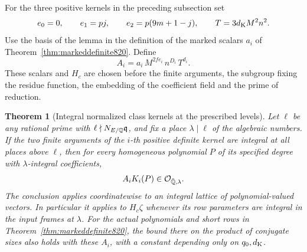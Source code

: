 \documentclass[a4paper,11pt]{article}
\newtheorem{theorem}[proposition]{Theorem}
\theoremstyle{definition}
\theoremstyle{remark}
\numberwithin{equation}{section}
\newcommand{\OO}{\mathcal O}
\begin{document}
For the three positive kernels in the preceding subsection set
\[
   e_0=0,\qquad e_1=pj,\qquad e_2=p(9m+1-j),\qquad
   T=3d_{\rm K} M^2 n^2 .
\]
Use the basis of the lemma in the definition of the marked
scalars \(a_i\) of Theorem~\ref{thm:markeddefinite820}. Define
\[
           A_i=a_i\, M^{2f e_i}\,n^{D_i}\,T^{d_i}.
\]
These scalars and \(H_c\) are chosen before the finite
arguments, the subgroup fixing the residue function, the
embedding of the coefficient field and the prime of reduction.

\begin{theorem}[Integral normalized class kernels at the prescribed levels]
\leavevmode\label{thm:scaleddefinite821}
Let \(\ell\) be any rational prime with
\(\ell\nmid N_{E/\mathbb Q}\mathfrak q\), and fix a place
\(\lambda\mid\ell\) of the algebraic numbers. If the two
finite arguments of the \(i\)-th positive definite kernel are
integral at all places above \(\ell\), then for every homogeneous
polynomial \(P\) of its specified degree with \(\lambda\)-integral
coefficients,
\[
                        A_i K_i(P)\in\OO_{\bar\QQ,\lambda}.
\]
The conclusion applies coordinatewise to an integral lattice
of polynomial-valued vectors. In particular it applies to
\(H_c\zeta\) whenever its row parameters are integral in
the input frames at \(\lambda\). For the actual polynomials
and short rows in Theorem~\ref{thm:markeddefinite820}, the
bound there on the product of conjugate sizes also holds
with these \(A_i\), with a constant depending only on
\(q_0,d_{\rm K}\).
\end{theorem}
\end{document}

